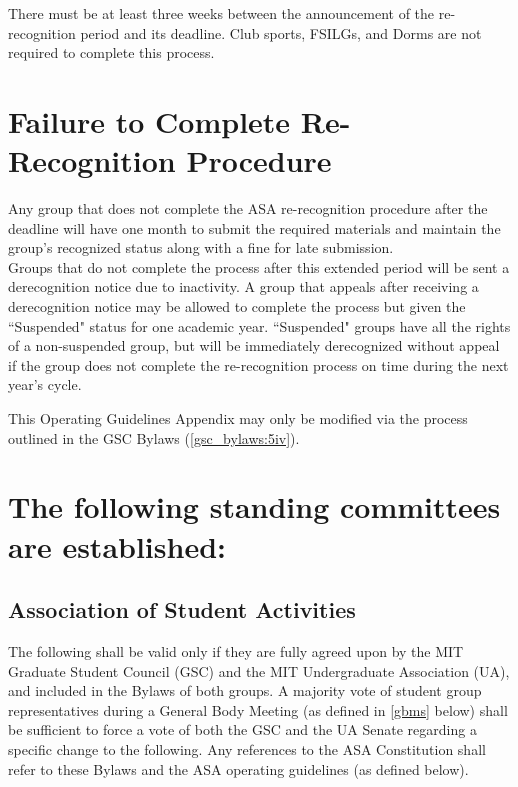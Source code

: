 \documentclass[12pt]{constitution}
\begin{document}
There must be at least three weeks between the announcement of the re-recognition period and its
    deadline. Club sports, FSILGs, and Dorms are not required to complete this process.

\section{Failure to Complete Re-Recognition Procedure}
Any group that does not complete the ASA re-recognition procedure after the deadline will have one
    month to submit the required materials and maintain the group's recognized status along with a
    fine for late submission.
\\

Groups that do not complete the process after this extended period will be sent a derecognition notice
    due to inactivity.
A group that appeals after receiving a derecognition notice may be allowed to complete the process
    but given the ``Suspended" status for one academic year.
``Suspended" groups have all the rights of a non-suspended group, but will be immediately derecognized
    without appeal if the group does not complete the re-recognition process on time during the next year's cycle.

This Operating Guidelines Appendix may only be modified via the process outlined in the GSC Bylaws (\ref{gsc_bylaws:5iv}).

\newpage

\label{app:C}

\setcounter{article}{1}

\setcounter{section}{6}
\let\secnum\Alph

\section{The following standing committees are established:}

\setcounter{subsection}{4}
\let\subsubnum\Roman
\subsection{Association of Student Activities}
The following shall be valid only if they are fully agreed upon by the MIT Graduate Student Council (GSC)
    and the MIT Undergraduate Association (UA), and included in the Bylaws of both groups.
A majority vote of student group representatives during a General Body Meeting
    (as defined in \ref{gbms} below) shall be sufficient to force a vote of both the GSC
    and the UA Senate regarding a specific change to the following.
Any references to the ASA Constitution shall refer to these Bylaws and the ASA operating guidelines (as defined below).
\end{document}

